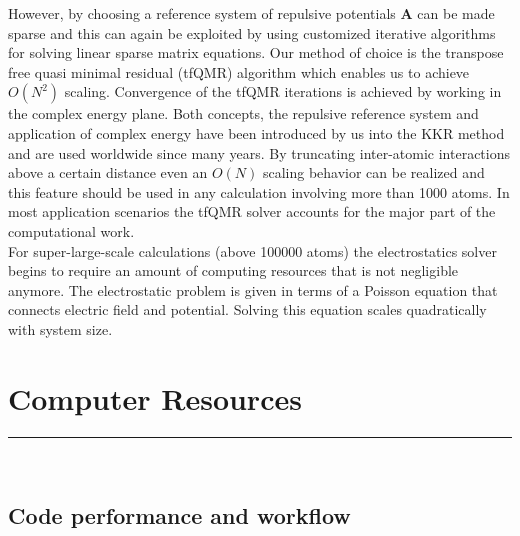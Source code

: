 \documentclass [a4paper, 12pt]{article}
\newcommand{\matr}[1]{\bm{#1}}
\begin{document}
However, by choosing a reference system of repulsive potentials
$\matr{A}$ can be made sparse and this can again be exploited
by using customized iterative algorithms for solving linear sparse matrix equations.
Our method of choice is the transpose free quasi minimal residual (tfQMR) algorithm \cite{freund_qmr:_1991}
which enables us to achieve $O(N^2)$ scaling. 
Convergence of the tfQMR iterations is achieved by working in the complex energy plane. Both concepts,
the repulsive reference system and application of complex energy have been
introduced by us into the KKR method \cite{zeller_application_1982,zeller_theory_1995}
and are used worldwide since many years. 
By truncating inter-atomic interactions above a certain distance even an $O(N)$ scaling 
behavior can be realized and this feature should be used in any calculation involving more than 1000 atoms.
In most application scenarios the tfQMR solver accounts for the major part of the computational work.
\\
For super-large-scale calculations (above 100000 atoms) the electrostatics solver begins
to require an amount of computing resources that is not negligible anymore. 
The electrostatic problem is given in terms of a Poisson equation that connects electric field and potential. 
Solving this equation scales quadratically with system size. 


\section{Computer Resources}
\rule{\textwidth}{0.4pt}\\
\subsection{Code performance and workflow}
\end{document}
